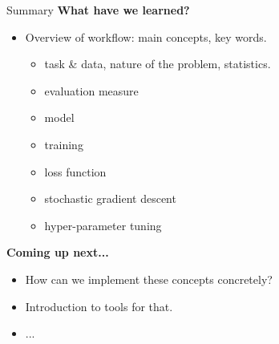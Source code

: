 \begin{frame}{Summary}
\textbf{What have we learned?}
\begin{itemize}
\item Overview of workflow: main concepts, key words.
\begin{itemize}
\item task \& data, nature of the problem, statistics.
\item evaluation measure
\item model
\item training
\item loss function
\item stochastic gradient descent
\item hyper-parameter tuning
\end{itemize}
\end{itemize}
\vsp
\textbf{Coming up next...}
\begin{itemize}
\item How can we implement these concepts concretely?
\item Introduction to tools for that.
\item ...
\end{itemize}
\end{frame}
